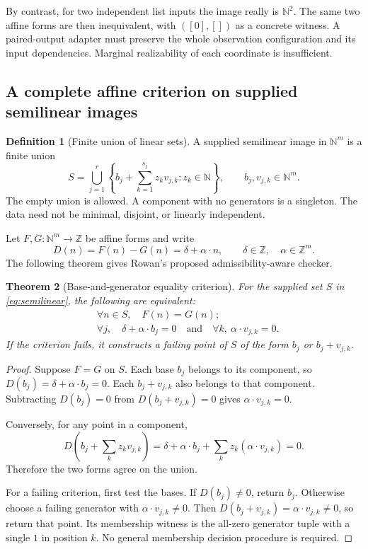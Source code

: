 \documentclass[11pt,letterpaper]{article}
\newcommand{\N}{\mathbb N}\newcommand{\Z}{\mathbb Z}\newcommand{\Q}{\mathbb Q}\newcommand{\R}{\mathbb R}
\newtheorem{theorem}{Theorem}[section]
\theoremstyle{definition}\newtheorem{definition}[theorem]{Definition}
\theoremstyle{remark}\newtheorem{remark}[theorem]{Remark}
\begin{document}
By contrast, for two independent list inputs the image really is $\N^2$.
The same two affine forms are then inequivalent, with $([0],[])$ as a
concrete witness. A paired-output adapter must preserve the whole observation
configuration and its input dependencies. Marginal realizability of each
coordinate is insufficient.

\subsection{A complete affine criterion on supplied semilinear images}
\begin{definition}[Finite union of linear sets]
A supplied semilinear image in $\N^m$ is a finite union
\begin{equation}\label{eq:semilinear}
 S=\bigcup_{j=1}^{r}
 \left\{b_j+\sum_{k=1}^{s_j}z_kv_{j,k}:z_k\in\N\right\},
 \qquad b_j,v_{j,k}\in\N^m.
\end{equation}
The empty union is allowed. A component with no generators is a singleton.
The data need not be minimal, disjoint, or linearly independent.
\end{definition}

Let $F,G:\N^m\to\Z$ be affine forms and write
\[
 D(n)=F(n)-G(n)=\delta+\alpha\cdot n,
 \qquad\delta\in\Z,\quad\alpha\in\Z^m.
\]
The following theorem gives Rowan's proposed admissibility-aware checker.
\begin{theorem}[Base-and-generator equality criterion]\label{thm:basis}
For the supplied set $S$ in \eqref{eq:semilinear}, the following are equivalent:
\begin{align*}
 &\forall n\in S,\quad F(n)=G(n);\\
 &\forall j,\quad \delta+\alpha\cdot b_j=0
       \quad\text{and}\quad
       \forall k,\ \alpha\cdot v_{j,k}=0.
\end{align*}
If the criterion fails, it constructs a failing point of $S$ of the form
$b_j$ or $b_j+v_{j,k}$.
\end{theorem}
\begin{proof}
Suppose $F=G$ on $S$. Each base $b_j$ belongs to its component, so
$D(b_j)=\delta+\alpha\cdot b_j=0$. Each $b_j+v_{j,k}$ also belongs to
that component. Subtracting $D(b_j)=0$ from $D(b_j+v_{j,k})=0$ gives
$\alpha\cdot v_{j,k}=0$.

Conversely, for any point in a component,
\[
 D\left(b_j+\sum_kz_kv_{j,k}\right)
 =\delta+\alpha\cdot b_j+\sum_kz_k(\alpha\cdot v_{j,k})=0.
\]
Therefore the two forms agree on the union.

For a failing criterion, first test the bases. If $D(b_j)\ne0$, return
$b_j$. Otherwise choose a failing generator with $\alpha\cdot v_{j,k}\ne0$.
Then $D(b_j+v_{j,k})=\alpha\cdot v_{j,k}\ne0$, so return that point.
Its membership witness is the all-zero generator tuple with a single $1$
in position $k$. No general membership decision procedure is required.
\end{proof}
\end{document}
